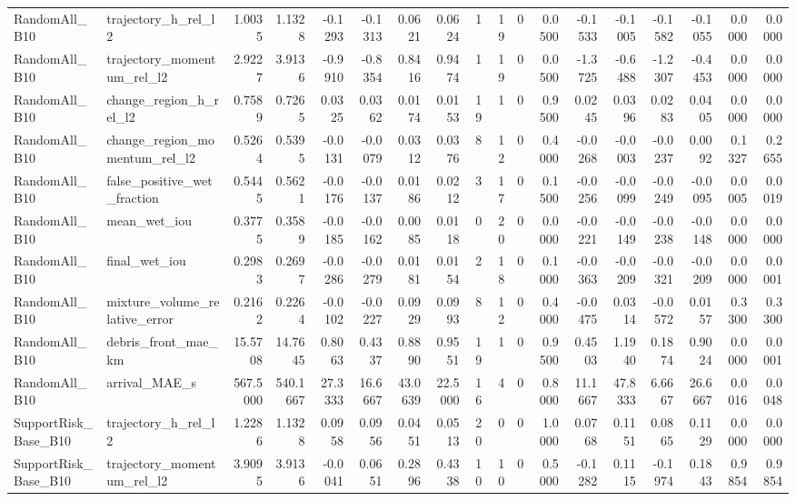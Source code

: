 \begin{tabular}{llrrrrrrrrrrrrrrrr}
RandomAll_B10 & trajectory_h_rel_l2 & 1.0035 & 1.1328 & -0.1293 & -0.1313 & 0.0621 & 0.0624 & 1 & 19 & 0 & 0.0500 & -0.1533 & -0.1005 & -0.1582 & -0.1055 & 0.0000 & 0.0000 \\
RandomAll_B10 & trajectory_momentum_rel_l2 & 2.9227 & 3.9136 & -0.9910 & -0.8354 & 0.8416 & 0.9474 & 1 & 19 & 0 & 0.0500 & -1.3725 & -0.6488 & -1.2307 & -0.4453 & 0.0000 & 0.0000 \\
RandomAll_B10 & change_region_h_rel_l2 & 0.7589 & 0.7265 & 0.0325 & 0.0362 & 0.0174 & 0.0153 & 19 & 1 & 0 & 0.9500 & 0.0245 & 0.0396 & 0.0283 & 0.0405 & 0.0000 & 0.0000 \\
RandomAll_B10 & change_region_momentum_rel_l2 & 0.5264 & 0.5395 & -0.0131 & -0.0079 & 0.0312 & 0.0376 & 8 & 12 & 0 & 0.4000 & -0.0268 & -0.0003 & -0.0237 & 0.0092 & 0.1327 & 0.2655 \\
RandomAll_B10 & false_positive_wet_fraction & 0.5445 & 0.5621 & -0.0176 & -0.0137 & 0.0186 & 0.0212 & 3 & 17 & 0 & 0.1500 & -0.0256 & -0.0099 & -0.0249 & -0.0095 & 0.0005 & 0.0019 \\
RandomAll_B10 & mean_wet_iou & 0.3775 & 0.3589 & -0.0185 & -0.0162 & 0.0085 & 0.0118 & 0 & 20 & 0 & 0.0000 & -0.0221 & -0.0149 & -0.0238 & -0.0148 & 0.0000 & 0.0000 \\
RandomAll_B10 & final_wet_iou & 0.2983 & 0.2697 & -0.0286 & -0.0279 & 0.0181 & 0.0154 & 2 & 18 & 0 & 0.1000 & -0.0363 & -0.0209 & -0.0321 & -0.0209 & 0.0000 & 0.0001 \\
RandomAll_B10 & mixture_volume_relative_error & 0.2162 & 0.2264 & -0.0102 & -0.0227 & 0.0929 & 0.0993 & 8 & 12 & 0 & 0.4000 & -0.0475 & 0.0314 & -0.0572 & 0.0157 & 0.3300 & 0.3300 \\
RandomAll_B10 & debris_front_mae_km & 15.5708 & 14.7645 & 0.8063 & 0.4337 & 0.8890 & 0.9551 & 19 & 1 & 0 & 0.9500 & 0.4503 & 1.1940 & 0.1874 & 0.9024 & 0.0000 & 0.0001 \\
RandomAll_B10 & arrival_MAE_s & 567.5000 & 540.1667 & 27.3333 & 16.6667 & 43.0639 & 22.5000 & 16 & 4 & 0 & 0.8000 & 11.1667 & 47.8333 & 6.6667 & 26.6667 & 0.0016 & 0.0048 \\
SupportRisk_Base_B10 & trajectory_h_rel_l2 & 1.2286 & 1.1328 & 0.0958 & 0.0956 & 0.0451 & 0.0513 & 20 & 0 & 0 & 1.0000 & 0.0768 & 0.1151 & 0.0865 & 0.1129 & 0.0000 & 0.0000 \\
SupportRisk_Base_B10 & trajectory_momentum_rel_l2 & 3.9095 & 3.9136 & -0.0041 & 0.0651 & 0.2896 & 0.4338 & 10 & 10 & 0 & 0.5000 & -0.1282 & 0.1115 & -0.1974 & 0.1843 & 0.9854 & 0.9854 \\

\end{tabular}
